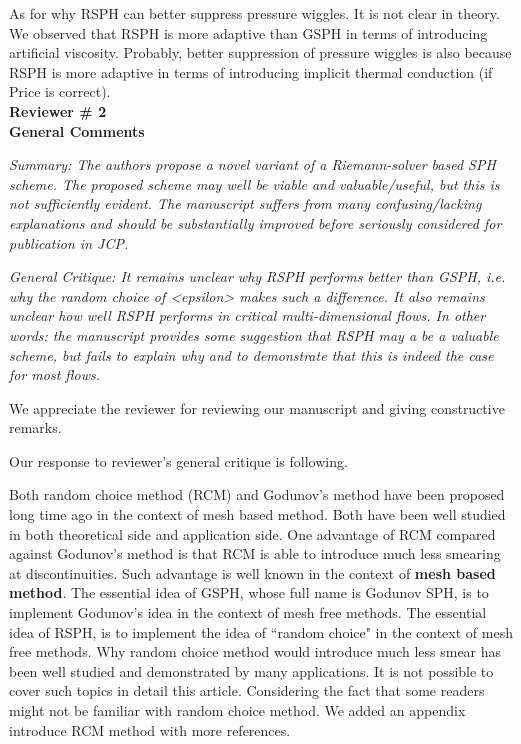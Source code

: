 \documentclass[10pt,a4paper]{article}
\begin{document}
As for why RSPH can better suppress pressure wiggles. It is not clear in theory. We observed that RSPH is more adaptive than GSPH in terms of introducing artificial viscosity. Probably, better suppression of pressure wiggles is also because RSPH is more adaptive in terms of introducing implicit thermal conduction (if Price is correct). 
\\[12pt]

\textbf{\Large Reviewer \# 2}\\[3pt]

\textbf{\large General Comments}

\textit{Summary: The authors propose a novel variant of a Riemann-solver based SPH scheme. The proposed scheme may well be viable and valuable/useful, but this is not sufficiently evident. The manuscript suffers from many confusing/lacking explanations and should be
substantially improved before seriously considered for publication in JCP.}

\textit{General Critique:
It remains unclear why RSPH performs better than GSPH, i.e. why the random choice of <epsilon> makes such a difference. It also remains unclear how well RSPH performs in critical multi-dimensional flows. In other words: the manuscript provides some suggestion that RSPH may a be a valuable scheme, but fails to explain why and to demonstrate that this is indeed the case for most flows.}

We appreciate the reviewer for reviewing our manuscript and giving constructive remarks. 

Our response to reviewer's general critique is following. 

Both random choice method (RCM) and Godunov's method have been proposed long time ago in the context of mesh based method. Both have been well studied in both theoretical side and application side. One advantage of RCM compared against Godunov's method is that RCM is able to introduce much less smearing at discontinuities. Such advantage is well known in the context of \textbf{mesh based method}.
The essential idea of GSPH, whose full name is Godunov SPH, is to implement Godunov's idea in the context of mesh free methods. The essential idea of RSPH, is to implement the idea of ``random choice" in the context of mesh free methods. Why random choice method would introduce much less smear has been well studied and demonstrated by many applications. It is not possible to cover such topics in detail this article.
Considering the fact that some readers might not be familiar with random choice method. We added an appendix introduce RCM method with more references.
\end{document}
